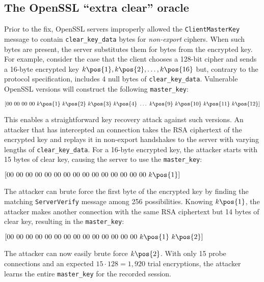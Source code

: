 \subsection{The OpenSSL ``extra clear'' oracle}


\label{sec:clear-key-vuln}

Prior to the fix, OpenSSL servers improperly allowed the \texttt{ClientMasterKey} message to contain
\texttt{clear\_key\_data} bytes for \emph{non-export} ciphers.  When such bytes are present,
the server substitutes them for bytes from the
encrypted key. For example, consider the case that the client chooses a 128-bit cipher and sends a 16-byte
encrypted key $k\pos{1}, k\pos{2}, \ldots, k\pos{16}$ but, contrary to the protocol specification, includes 4
null bytes of \texttt{clear\_key\_data}. Vulnerable OpenSSL versions will
construct the following \texttt{master\_key}:

\small $[00\ 00\ 00\ 00\ k\pos{1}\ k\pos{2}\ k\pos{3}\ k\pos{4}\ \dots\ k\pos{9}\ k\pos{10}\ k\pos{11}\ k\pos{12}]$\normalsize

This enables a straightforward key recovery attack against such versions.
An attacker that has intercepted an \ssltwo connection takes the RSA
ciphertext of the encrypted key and replays it in non-export handshakes to
the server with varying lengths of \texttt{clear\_key\_data}. For a 16-byte
encrypted key, the attacker starts with 15 bytes of clear key, causing the server to use the \texttt{master\_key}:

\small$[00\ 00\ 00\ 00\ 00\ 00\ 00\ 00\ 00\ 00\ 00\ 00\ 00\ 00\ 00\ k\pos{1}]$\normalsize

The attacker can brute force the first byte of the encrypted key by
finding the matching \texttt{ServerVerify} message among 256
possibilities. Knowing $k\pos{1}$, the attacker makes another
connection with the same RSA ciphertext but 14 bytes of clear key,
resulting in the \texttt{master\_key}:

\small $[00\ 00\ 00\ 00\ 00\ 00\ 00\ 00\ 00\ 00\ 00\ 00\ 00\ 00\ k\pos{1}\ k\pos{2}]$\normalsize

The attacker can now easily brute force $k\pos{2}$. With only 15 probe
connections and an expected $15 \cdot 128 = 1,920$
trial encryptions, the attacker learns the entire \texttt{master\_key} for the
recorded session.

